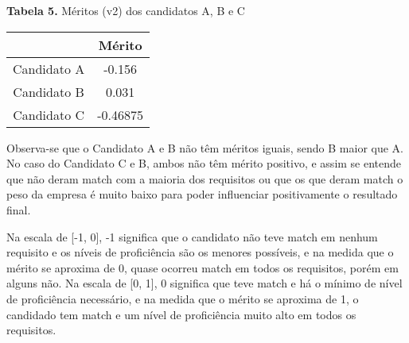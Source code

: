 \documentclass[]{article}
\begin{document}
	
	\begin{center}
		\noindent \textbf{Tabela 5.}
		\noindent Méritos (v2) dos candidatos A, B e C
		
		\begin{tabular}{| c | c |} 
			\hline
			& Mérito \\ [0.5ex] 
			\hline
			Candidato A & -0.156 \\
			\hline
			Candidato B & 0.031  \\
			\hline
			Candidato C & -0.46875 \\
			\hline
		\end{tabular}
	\end{center}
	
	Observa-se que o Candidato A e B não têm méritos iguais, sendo B maior que A. No caso do Candidato C e B, ambos não têm mérito positivo, e assim se entende que não deram match com a maioria dos requisitos ou que os que deram match o peso da empresa é muito baixo para poder influenciar positivamente o resultado final.
	
	Na escala de [-1, 0], -1 significa que o candidato não teve match em nenhum requisito e os níveis de proficiência são os menores possíveis, e na medida que o mérito se aproxima de 0, quase ocorreu match em todos os requisitos, porém em alguns não. Na escala de [0, 1], 0 significa que teve match e há o mínimo de nível de proficiência necessário, e na medida que o mérito se aproxima de 1, o candidado tem match e um nível de proficiência muito alto em todos os requisitos.
	
\end{document}
